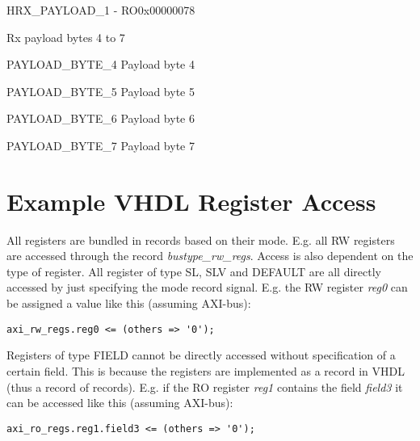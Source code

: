 \documentclass{article}
\begin{document}
\begin{register}{H}{RX{\_}PAYLOAD{\_}1 - RO}{0x00000078}  \par Rx payload bytes 4 to 7 \regnewline
  \label{RX_PAYLOAD_1}
\regnewline
  \begin{regdesc}\begin{reglist}
    \item [PAYLOAD{\_}BYTE{\_}4] Payload byte 4    \item [PAYLOAD{\_}BYTE{\_}5] Payload byte 5    \item [PAYLOAD{\_}BYTE{\_}6] Payload byte 6    \item [PAYLOAD{\_}BYTE{\_}7] Payload byte 7  \end{reglist}\end{regdesc}
\end{register}

\section{Example VHDL Register Access}

\par
All registers are bundled in records based on their mode. E.g. all RW registers are accessed through the record \textit{bustype\_rw\_regs}. Access is also dependent on the type of register. All register of type SL, SLV and DEFAULT are all directly accessed by just specifying the mode record signal. E.g. the RW register \textit{reg0} can be assigned a value like this (assuming AXI-bus):

\begin{lstlisting}[style=vhdl]
axi_rw_regs.reg0 <= (others => '0');
\end{lstlisting}

\par Registers of type FIELD cannot be directly accessed without specification of a certain field. This is because the registers are implemented as a record in VHDL (thus a record of records). E.g. if the RO register \textit{reg1} contains the field \textit{field3} it can be accessed like this (assuming AXI-bus):

\begin{lstlisting}[style=vhdl]
axi_ro_regs.reg1.field3 <= (others => '0');
\end{lstlisting}
\end{document}
